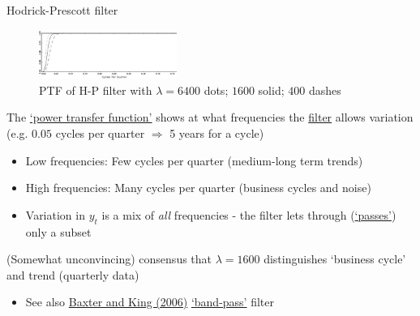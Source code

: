 \begin{frame}{Hodrick-Prescott filter}

\begin{figure}
\caption[Power Transfer Function]{PTF of H-P filter with $\lambda =6400$ dots; $1600$ solid; $400$ dashes}
\centering
\label{fig:hp_ptf}
\includegraphics[width=0.40\textwidth]{Figures/hp_ptf.JPG}
\end{figure}

The \href{https://en.wikipedia.org/wiki/Filter_(signal_processing)\#The_transfer_function}{`power transfer function'} shows at what frequencies the \href{https://en.wikipedia.org/wiki/Filter_(signal_processing)}{filter} allows variation (e.g. $0.05$ cycles per quarter $\Rightarrow$ 5 years for a cycle)
	\begin{itemize}
	\item	Low frequencies: Few cycles per quarter (medium-long term trends)
	\item	High frequencies: Many cycles per quarter (business cycles and noise)
	\item	Variation in $y_{t}$ is a mix of \textit{all} frequencies - the filter lets through (\href{https://en.wikipedia.org/wiki/High-pass_filter\#/media/File:75_Hz_HPF_on_Smaart.jpg}{`passes'}) only a subset
	\end{itemize}
(Somewhat unconvincing) consensus that $\lambda =1600$ distinguishes `business cycle' and trend (quarterly data)
	\begin{itemize}
	\item	See also \href{https://www.mitpressjournals.org/doi/10.1162/003465399558454}{Baxter and King (2006)} \href{https://en.wikipedia.org/wiki/Band-pass_filter}{`band-pass'} filter
	\end{itemize}

\end{frame}



